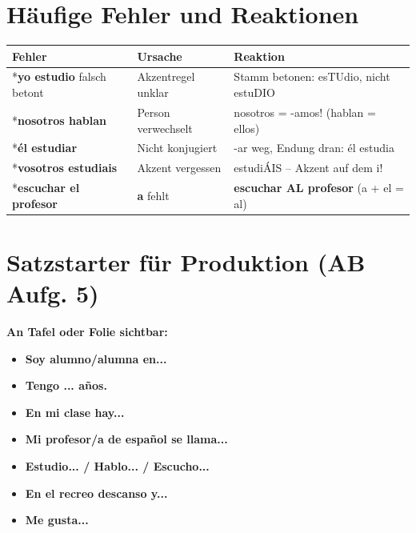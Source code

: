 \documentclass[11pt,a4paper]{article}
\newcommand{\es}[1]{\textbf{#1}}
\begin{document}
\section*{Häufige Fehler und Reaktionen}

\begin{tabular}{|p{3.5cm}|p{3.5cm}|p{6cm}|}
\hline
\textbf{Fehler} & \textbf{Ursache} & \textbf{Reaktion} \\
\hline
*\es{yo estudio} falsch betont & Akzentregel unklar & Stamm betonen: esTUdio, nicht estuDIO \\
\hline
*\es{nosotros hablan} & Person verwechselt & nosotros = -amos! (hablan = ellos) \\
\hline
*\es{él estudiar} & Nicht konjugiert & -ar weg, Endung dran: él estudia \\
\hline
*\es{vosotros estudiais} & Akzent vergessen & estudiÁIS -- Akzent auf dem i! \\
\hline
*\es{escuchar el profesor} & \es{a} fehlt & \es{escuchar AL profesor} (a + el = al) \\
\hline
\end{tabular}

\vspace{0.5cm}

\section*{Satzstarter für Produktion (AB Aufg. 5)}

\begin{tcolorbox}[colback=hellgrau, colframe=grau]
\textbf{An Tafel oder Folie sichtbar:}

\vspace{0.3cm}
\begin{itemize}[nosep]
    \item \es{Soy alumno/alumna en...}
    \item \es{Tengo ... años.}
    \item \es{En mi clase hay...}
    \item \es{Mi profesor/a de español se llama...}
    \item \es{Estudio... / Hablo... / Escucho...}
    \item \es{En el recreo descanso y...}
    \item \es{Me gusta...}
\end{itemize}
\end{tcolorbox}
\end{document}
